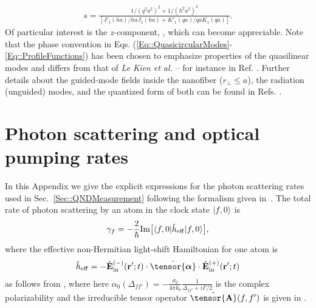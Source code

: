 \documentclass[preprint, aps,pra,onecolumn]{revtex4-1} %
\newcommand{\poltens}{\hat{\tensor{\boldsymbol{\alpha}}}}
\newcommand{\charpol}{\alpha_0(\Delta_{f\!f'})}
\begin{document}
\begin{appendix}
	\begin{align}
		s = \frac{1/(q^2 a^2)^{2} + 1/(h^2 a^2)^{2}}{[J'_1(ha)/haJ_1(ha) + K'_1(qa)/qaK_1(qa)]}.
	\end{align}  
Of particular interest is the $z$-component, , which can become appreciable.  Note that the phase convention in Eqs. (\ref{Eq::QuasicircularModes}-\ref{Eq::ProfileFunctions}) has been chosen to emphasize properties of the quasilinear modes and differs from that of \emph{Le Kien et al.} -- for instance in Ref. \cite{le_kien_propagation_2014}.  
Further details about the guided-mode fields inside the nanofiber ($r_\perp\leq a$), the radiation (unguided) modes, and the quantized form of both can be found in Refs. \cite{sondergaard_general_2001, tong_single-mode_2004, kien_field_2004, le_kien_spontaneous_2005, vetsch_eugen_optical_2010}.


\section{Photon scattering and optical pumping rates} \label{Appendix::Rates}	

In this Appendix we give the explicit expressions for the photon scattering rates used in Sec.~\ref{Sec::QNDMeasurement} following the formalism given in~\cite{deutsch_quantum_2010}.  The total rate of photon scattering by an atom in the clock state $\lvert{f,0}\rangle$ is
	\begin{equation}\label{Eq::gammaf}
		\gamma_{f}=- \frac{2}{\hbar} {\rm Im} \big[ \langle{f,0}\rvert \hat{h}_{\rm eff}\lvert{f,0}\rangle \big] ,
	\end{equation}
where the effective non-Hermitian light-shift Hamiltonian for one atom is 
\begin{align}
\hat{h}_{\rm eff} = - \hat{\mathbf{E}}^{(-)}_{\rm in}(\mathbf{r}' ; t ) \cdot \poltens \cdot \hat{\mathbf{E}}^{(+)}_{\rm in}(\mathbf{r}' ;t )
\end{align}
as follows from , where here $\charpol = -\frac{\sigma_0}{4\pi k_0}\frac{1}{\Delta_{ff'}+i\Gamma/2}$ is the complex polarizability and the irreducible tensor operator $ \hat{\tensor{\mbf{A}}}(f,f') $ is given in .



\end{appendix}
\end{document}
